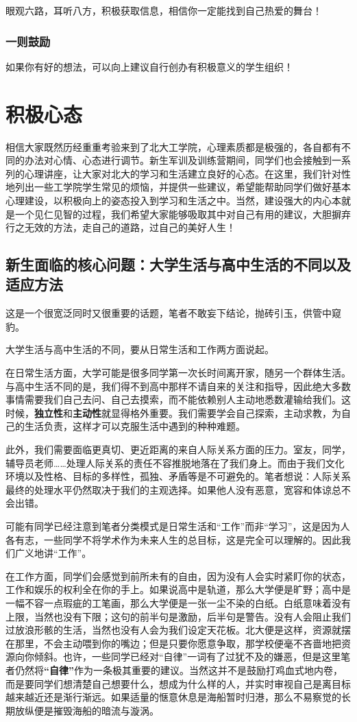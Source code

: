 \documentclass[11pt,oneside]{book}
\begin{document}
眼观六路，耳听八方，积极获取信息，相信你一定能找到自己热爱的舞台！

\subsection{一则鼓励}
如果你有好的想法，可以向上建议自行创办有积极意义的学生组织！


\chapter{积极心态}
相信大家既然历经重重考验来到了北大工学院，心理素质都是极强的，各自都有不同的办法对心情、心态进行调节。新生军训及训练营期间，同学们也会接触到一系列的心理讲座，让大家对北大的学习和生活建立良好的心态。在这里，我们针对性地列出一些工学院学生常见的烦恼，并提供一些建议，希望能帮助同学们做好基本心理建设，以积极向上的姿态投入到学习和生活之中。当然，建设强大的内心本就是一个见仁见智的过程，我们希望大家能够吸取其中对自己有用的建议，大胆摒弃行之无效的方法，走自己的道路，过自己的美好人生！

\section{新生面临的核心问题：大学生活与高中生活的不同以及适应方法}
这是一个很宽泛同时又很重要的话题，笔者不敢妄下结论，抛砖引玉，供管中窥豹。

大学生活与高中生活的不同，要从日常生活和工作两方面说起。

在日常生活方面，大学可能是很多同学第一次长时间离开家，随另一个群体生活。与高中生活不同的是，我们得不到高中那样不请自来的关注和指导，因此绝大多数事情需要我们自己去问、自己去摸索，而不能依赖别人主动地悉数灌输给我们。这时候，\textbf{独立性}和\textbf{主动性}就显得格外重要。我们需要学会自己探索，主动求教，为自己的生活负责，这样才可以克服生活中遇到的种种难题。

此外，我们需要面临更真切、更近距离的来自人际关系方面的压力。室友，同学，辅导员老师……处理人际关系的责任不容推脱地落在了我们身上。而由于我们文化环境以及性格、目标的多样性，孤独、矛盾等是不可避免的。笔者想说：人际关系最终的处理水平仍然取决于我们的主观选择。如果他人没有恶意，宽容和体谅总不会出错。

可能有同学已经注意到笔者分类模式是日常生活和“工作”而非“学习”，这是因为人各有志，一些同学不将学术作为未来人生的总目标，这是完全可以理解的。因此我们广义地讲“工作”。

在工作方面，同学们会感觉到前所未有的自由，因为没有人会实时紧盯你的状态，工作和娱乐的权利全在你的手上。如果说高中是轨道，那么大学便是旷野；高中是一幅不容一点瑕疵的工笔画，那么大学便是一张一尘不染的白纸。白纸意味着没有上限，当然也没有下限；这句的前半句是激励，后半句是警告。没有人会阻止我们过放浪形骸的生活，当然也没有人会为我们设定天花板。北大便是这样，资源就摆在那里，不会主动喂到你的嘴边；但是只要你愿意争取，那学校便毫不吝啬地把资源向你倾斜。也许，一些同学已经对“自律”一词有了过犹不及的嫌恶，但是这里笔者仍然将\textbf{“自律”}作为一条极其重要的建议。当然这并不是鼓励打鸡血式地内卷，而是要同学们想清楚自己想要什么，想成为什么样的人，并实时审视自己是离目标越来越近还是渐行渐远。如果适量的惬意休息是海船暂时归港，那么不易察觉的长期放纵便是摧毁海船的暗流与漩涡。
\end{document}
